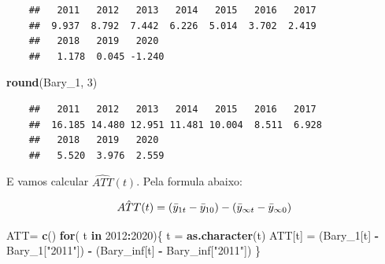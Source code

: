 \documentclass[portugues]{article}
\newenvironment{Shaded}{\begin{snugshade}}{\end{snugshade}}
\newcommand{\ControlFlowTok}[1]{\textcolor[rgb]{0.13,0.29,0.53}{\textbf{#1}}}
\newcommand{\DecValTok}[1]{\textcolor[rgb]{0.00,0.00,0.81}{#1}}
\newcommand{\FunctionTok}[1]{\textcolor[rgb]{0.13,0.29,0.53}{\textbf{#1}}}
\newcommand{\NormalTok}[1]{#1}
\newcommand{\OtherTok}[1]{\textcolor[rgb]{0.56,0.35,0.01}{#1}}
\newcommand{\SpecialCharTok}[1]{\textcolor[rgb]{0.81,0.36,0.00}{\textbf{#1}}}
\newcommand{\StringTok}[1]{\textcolor[rgb]{0.31,0.60,0.02}{#1}}
\begin{document}
\begin{boxA}
\begin{Shaded}
    \end{Shaded}

    \begin{verbatim}
    ##   2011   2012   2013   2014   2015   2016   2017   
    ##  9.937  8.792  7.442  6.226  5.014  3.702  2.419  
    ##   2018   2019   2020 
    ##   1.178  0.045 -1.240
    \end{verbatim}

    \begin{Shaded}
    \begin{Highlighting}[]
    \FunctionTok{round}\NormalTok{(Bary\_1, }\DecValTok{3}\NormalTok{)}
    \end{Highlighting}
    \end{Shaded}

    \begin{verbatim}
    ##   2011   2012   2013   2014   2015   2016   2017    
    ##  16.185 14.480 12.951 11.481 10.004  8.511  6.928 
    ##   2018   2019   2020 
    ##   5.520  3.976  2.559
    \end{verbatim}

    E vamos calcular \(\hat{ATT}(t)\). Pela formula abaixo:
    
    \[ \Hat{ATT}(t) = (\Bar{y}_{1t} - \Bar{y}_{10}) - (\Bar{y}_{\infty t} -  \Bar{y}_{\infty 0}) \]
    
    \begin{Shaded}
    \begin{Highlighting}[]
    \NormalTok{ATT}\OtherTok{=} \FunctionTok{c}\NormalTok{()}
    \ControlFlowTok{for}\NormalTok{( t }\ControlFlowTok{in} \DecValTok{2012}\SpecialCharTok{:}\DecValTok{2020}\NormalTok{)\{}
    \NormalTok{  t }\OtherTok{=} \FunctionTok{as.character}\NormalTok{(t)}
    \NormalTok{  ATT[t] }\OtherTok{=}\NormalTok{ (Bary\_1[t] }\SpecialCharTok{{-}}\NormalTok{ Bary\_1[}\StringTok{"2011"}\NormalTok{]) }
    \hspace{60} \SpecialCharTok{{-}} \NormalTok{ (Bary\_inf[t] }\SpecialCharTok{{-}}\NormalTok{ Bary\_inf[}\StringTok{"2011"}\NormalTok{])}
    \NormalTok{\}}


\end{Highlighting}
\end{Shaded}
\end{boxA}
\end{document}

